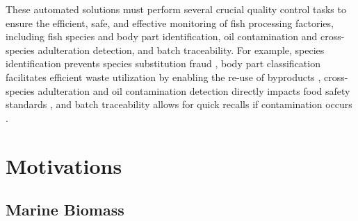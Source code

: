 These automated solutions must perform several crucial quality control tasks to ensure the efficient, safe, and effective monitoring of fish processing factories, including fish species and body part identification, oil contamination and cross-species adulteration detection, and batch traceability. For example, species identification prevents species substitution fraud \citep{Australia2016}, body part classification facilitates efficient waste utilization by enabling the re-use of byproducts \citep{Ghaly2013}, cross-species adulteration and oil contamination detection directly impacts food safety standards \citep{Premanandh2013}, and batch traceability allows for quick recalls if contamination occurs \citep{Mai2010}.

\section{Motivations}




\subsection{Marine Biomass}


